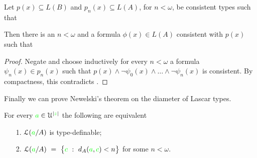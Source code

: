 \documentclass[creche.tex]{subfiles}
\begin{document}
\begin{lemma}\label{Baire}
Let $p(x)\subseteq L(B)$ and $p_n(x)\subseteq L(A)$, for $n<\omega$, be consistent types such that\smallskip


\noindent Then there is an $n<\omega$ and a formula $\phi(x)\in L(A)$ consistent with $p(x)$ such that \smallskip

\end{lemma}
\begin{proof}
Negate  and choose inductively for every $n<\omega$ a formula $\psi_n(x)\in p_n(x)$ such that $p(x)\wedge\neg\psi_0(x)\wedge\dots\wedge\neg\psi_n(x)$ is consistent. By compactness, this contradicts .
\end{proof}



Finally we can prove Newelski's theorem on the diameter of Lascar types.


\begin{theorem}[ (Newelski)]
For every ${\color{green} a}\in\EuScript U^{|{\color{green} z}|}$ the following are equivalent
\begin{itemize}
 \item[1.] $\EuScript L({\color{green} a}/A)$ is type-definable;
 \item[2.] $\EuScript L({\color{green} a}/A)\ =\ \big\{{\color{green} c}\ :\ d_A({\color{green} a},{\color{green} c})<n\big\}$ for some $n<\omega$.
\end{itemize}
\end{theorem}
\end{document}
